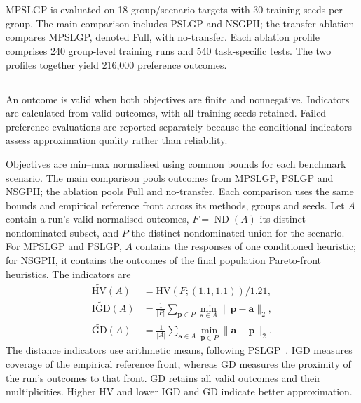 \begingroup
\color{resultrevision}
\section{}
\label{sec:results}
MPSLGP is evaluated on 18 group/scenario targets with 30 training seeds per group. The main comparison includes PSLGP and NSGPII; the transfer ablation compares MPSLGP, denoted Full, with no-transfer. Each ablation profile comprises 240 group-level training runs and 540 task-specific tests. The two profiles together yield 216,000 preference outcomes.

\subsection{}
An outcome is valid when both objectives are finite and nonnegative. Indicators are calculated from valid outcomes, with all training seeds retained. Failed preference evaluations are reported separately because the conditional indicators assess approximation quality rather than reliability.

Objectives are min--max normalised using common bounds for each benchmark scenario. The main comparison pools outcomes from MPSLGP, PSLGP and NSGPII; the ablation pools Full and no-transfer. Each comparison uses the same bounds and empirical reference front across its methods, groups and seeds. Let $A$ contain a run's valid normalised outcomes, $F=\operatorname{ND}(A)$ its distinct nondominated subset, and $P$ the distinct nondominated union for the scenario. For MPSLGP and PSLGP, $A$ contains the responses of one conditioned heuristic; for NSGPII, it contains the outcomes of the final population Pareto-front heuristics. The indicators are
\begin{equation}
\begin{aligned}
\widetilde{\mathrm{HV}}(A)&=\mathrm{HV}(F;(1.1,1.1))/1.21,\\
\widetilde{\mathrm{IGD}}(A)&=\frac{1}{|P|}\sum_{\mathbf p\in P}\min_{\mathbf a\in A}\|\mathbf p-\mathbf a\|_2,\\
\widetilde{\mathrm{GD}}(A)&=\frac{1}{|A|}\sum_{\mathbf a\in A}\min_{\mathbf p\in P}\|\mathbf a-\mathbf p\|_2.
\end{aligned}
\label{eq:descriptive-test-metrics}
\end{equation}
The distance indicators use arithmetic means, following PSLGP~\cite{xu2026pslgp}. IGD measures coverage of the empirical reference front, whereas GD measures the proximity of the run's outcomes to that front. GD retains all valid outcomes and their multiplicities. Higher HV and lower IGD and GD indicate better approximation.


